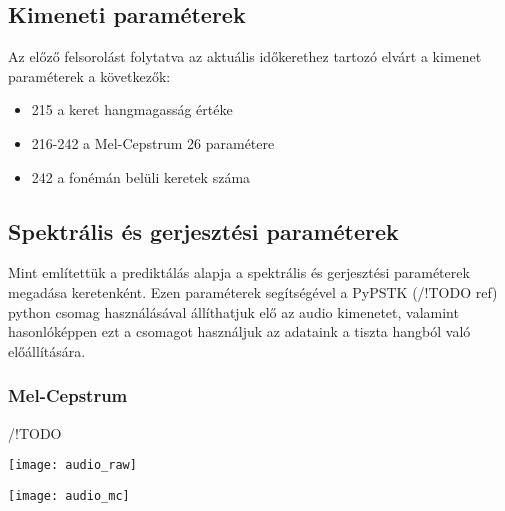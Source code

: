 \subsection{Kimeneti paraméterek}
Az előző felsorolást folytatva az aktuális időkerethez tartozó elvárt a kimenet paraméterek a következők:

 
\begin{itemize}
	\item 215 a keret hangmagasság értéke
	\item 216-242 a Mel-Cepstrum 26 paramétere
	\item 242 a fonémán belüli keretek száma
\end{itemize}
\subsection{Spektrális és gerjesztési paraméterek}
Mint említettük a prediktálás alapja a spektrális és gerjesztési paraméterek megadása keretenként. Ezen paraméterek segítségével a PyPSTK (/!TODO ref) python csomag használásával állíthatjuk elő az audio kimenetet, valamint hasonlóképpen ezt a csomagot használjuk az adataink a tiszta hangból való előállítására.
\subsubsection{Mel-Cepstrum}
/!TODO

\texttt{[image: audio\_raw]}

\texttt{[image: audio\_mc]}